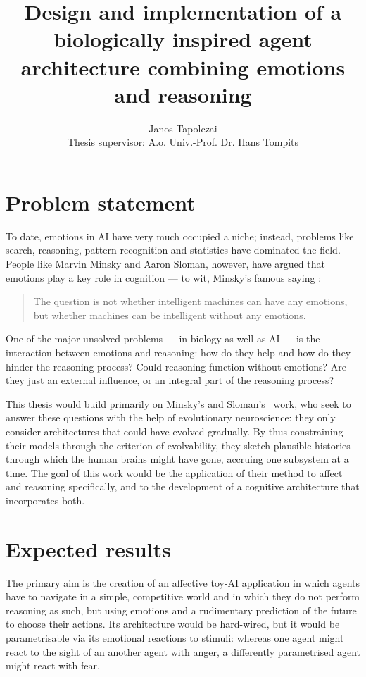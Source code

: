 \documentclass[bibliography=totoc ]{scrartcl}
\title{{\huge Design and implementation of a biologically inspired agent architecture combining emotions and reasoning}}
\author{Janos Tapolczai\\
Thesis supervisor: A.o. Univ.-Prof. Dr. Hans Tompits}
\begin{document}
\maketitle

\section{Problem statement}

To date, emotions in AI have very much occupied a niche; instead, problems like search, reasoning, pattern recognition and statistics have dominated the field. People like Marvin Minsky and Aaron Sloman, however, have argued that emotions play a key role in cognition --- to wit, Minsky's famous saying \cite[p. 163]{societyOfMind}:

\begin{quote}
The question is not whether intelligent machines can have any emotions, but whether machines can be intelligent without any emotions.
\end{quote}

One of the major unsolved problems --- in biology as well as AI --- is the interaction between emotions and reasoning: how do they help and how do they hinder the reasoning process? Could reasoning function without emotions? Are they just an external influence, or an integral part of the reasoning process?

This thesis would build primarily on Minsky's \cite{societyOfMind, emotionMachine} and Sloman's~\cite{slomanNiche} work, who seek to answer these questions with the help of evolutionary neuroscience: they only consider architectures that could have evolved gradually. By thus constraining their models through the criterion of evolvability, they sketch plausible histories through which the human brains might have gone, accruing one subsystem at a time. The goal of this work would be the application of their method to affect and reasoning specifically, and to the development of a cognitive architecture that incorporates both.

\section{Expected results}

The primary aim is the creation of an affective toy-AI application in which agents have to navigate in a simple, competitive world and in which they do not perform reasoning as such, but using emotions and a rudimentary prediction of the future to choose their actions. Its architecture would be hard-wired, but it would be parametrisable via its emotional reactions to stimuli: whereas one agent might react to the sight of an another agent with anger, a differently parametrised agent might react with fear.
\end{document}
